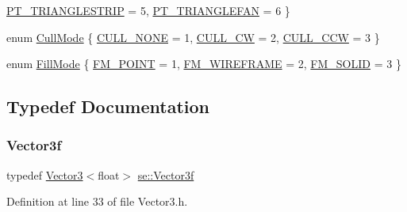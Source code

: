 \begin{DoxyCompactItemize}
\newline
\mbox{\hyperlink{namespacese_a2b33c0ed67b2f6ac40fc08d56b5984f9af1dc30b0215cc5631ab13e55d0f84245}{P\+T\+\_\+\+T\+R\+I\+A\+N\+G\+L\+E\+S\+T\+R\+IP}} = 5, 
\mbox{\hyperlink{namespacese_a2b33c0ed67b2f6ac40fc08d56b5984f9a488c78be1ea3d4d2c04df7361ad2deb8}{P\+T\+\_\+\+T\+R\+I\+A\+N\+G\+L\+E\+F\+AN}} = 6
 \}
\item 
enum \mbox{\hyperlink{namespacese_a2447de8e300e86ac4a8893e0486fc3bb}{Cull\+Mode}} \{ \mbox{\hyperlink{namespacese_a2447de8e300e86ac4a8893e0486fc3bbacbc4f36eef2f1f70e2be78a0d0d0f3a1}{C\+U\+L\+L\+\_\+\+N\+O\+NE}} = 1, 
\mbox{\hyperlink{namespacese_a2447de8e300e86ac4a8893e0486fc3bba120ff54e0a21a2a98c1c2845d6365587}{C\+U\+L\+L\+\_\+\+CW}} = 2, 
\mbox{\hyperlink{namespacese_a2447de8e300e86ac4a8893e0486fc3bba5536bb2fb75f55de03ccb4bfc8121371}{C\+U\+L\+L\+\_\+\+C\+CW}} = 3
 \}
\item 
enum \mbox{\hyperlink{namespacese_a7ab38efb91dff288cc8279bedd6bc02c}{Fill\+Mode}} \{ \mbox{\hyperlink{namespacese_a7ab38efb91dff288cc8279bedd6bc02caadf9f9fdffe8d13ef3ba62e57fb4c7e5}{F\+M\+\_\+\+P\+O\+I\+NT}} = 1, 
\mbox{\hyperlink{namespacese_a7ab38efb91dff288cc8279bedd6bc02ca26b9ffd3b450a7e62d50cd9255f0efcd}{F\+M\+\_\+\+W\+I\+R\+E\+F\+R\+A\+ME}} = 2, 
\mbox{\hyperlink{namespacese_a7ab38efb91dff288cc8279bedd6bc02ca395f84135ddec900797aee743841fffb}{F\+M\+\_\+\+S\+O\+L\+ID}} = 3
 \}
\end{DoxyCompactItemize}


\subsection{Typedef Documentation}
\mbox{\label{namespacese_a12e07512d95e2fdebdaf74a5ea2cf5f6}} 
\subsubsection{\texorpdfstring{Vector3f}{Vector3f}}
{\footnotesize\ttfamily typedef \mbox{\hyperlink{classse_1_1_vector3}{Vector3}}$<$float$>$ \mbox{\hyperlink{namespacese_a12e07512d95e2fdebdaf74a5ea2cf5f6}{se\+::\+Vector3f}}}



Definition at line 33 of file Vector3.\+h.

\mbox{\label{namespacese_ada11715de7cf6e87b5dfb4611fe68d29}} 

